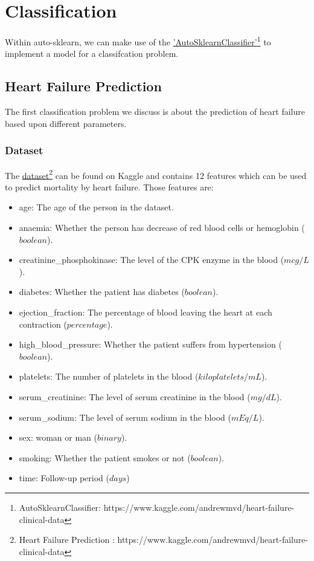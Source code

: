 \chapter{Classification}
\newcommand{\linkAutoSklearnClassifier}{https://www.kaggle.com/andrewmvd/heart-failure-clinical-data}

Within auto-sklearn, we can make use of the \href{\linkAutoSklearnClassifier}{'AutoSklearnClassifier'\footnote{AutoSklearnClassifier: \href{\linkAutoSklearnClassifier}{\linkAutoSklearnClassifier}}} to implement a model for a classifcation problem.

\section{Heart Failure Prediction}
\label{HeartFailurePrediction}

The first classification problem we discuss is about the prediction of heart failure based upon different parameters.

\subsection{Dataset}
\newcommand{\kagglelinkheartfailure}{https://www.kaggle.com/andrewmvd/heart-failure-clinical-data}

The \href{\kagglelinkheartfailure}{dataset\footnote{Heart Failure Prediction : \href{\kagglelinkheartfailure}{\kagglelinkheartfailure}}} can be found on Kaggle and contains 12 features which can be used to predict mortality by heart failure. Those features are:

\begin{itemize}
  \item age: The age of the person in the dataset.
  \item anaemia: Whether the person has decrease of red blood cells or hemoglobin ($boolean$).
  \item creatinine\_phosphokinase: The level of the CPK enzyme in the blood ($mcg/L$).
  \item diabetes: Whether the patient has diabetes ($boolean$).
  \item ejection\_fraction: The percentage of blood leaving the heart at each contraction ($percentage$).
  \item high\_blood\_pressure: Whether the patient suffers from hypertension ($boolean$).
  \item platelets: The number of platelets in the blood ($kiloplatelets/mL$).
  \item serum\_creatinine: The level of serum creatinine in the blood ($mg/dL$).
  \item serum\_sodium: The level of serum sodium in the blood ($mEq/L$).
  \item sex: woman or man ($binary$).
  \item smoking: Whether the patient smokes or not ($boolean$).
  \item time: Follow-up period ($days$)
\end{itemize}

